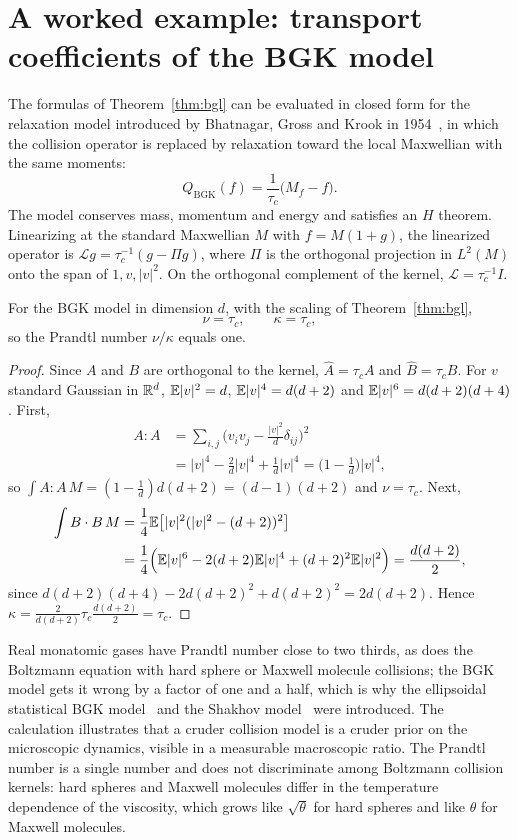 \section{A worked example: transport coefficients of the BGK model}

The formulas of Theorem~\ref{thm:bgl} can be evaluated in closed form for the relaxation model introduced by Bhatnagar, Gross and Krook in 1954~\cite{bhatnagar1954}, in which the collision operator is replaced by relaxation toward the local Maxwellian with the same moments:
\[
Q_{\mathrm{BGK}}(f) = \frac{1}{\tau_c}\big(M_f-f\big).
\]
The model conserves mass, momentum and energy and satisfies an $H$ theorem. Linearizing at the standard Maxwellian $M$ with $f = M(1+g)$, the linearized operator is $\mathcal{L}g = \tau_c^{-1}(g-\Pi g)$, where $\Pi$ is the orthogonal projection in $L^2(M)$ onto the span of $1,v,|v|^2$. On the orthogonal complement of the kernel, $\mathcal{L} = \tau_c^{-1}I$.

\begin{proposition}
For the BGK model in dimension $d$, with the scaling of Theorem~\ref{thm:bgl},
\[
\nu = \tau_c,\qquad\kappa = \tau_c,
\]
so the Prandtl number $\nu/\kappa$ equals one.
\end{proposition}

\begin{proof}
Since $A$ and $B$ are orthogonal to the kernel, $\hat A = \tau_cA$ and $\hat B = \tau_cB$. For $v$ standard Gaussian in $\mathbb{R}^d$, $\mathbb{E}|v|^2 = d$, $\mathbb{E}|v|^4 = d(d+2)$ and $\mathbb{E}|v|^6 = d(d+2)(d+4)$. First,
\[
\begin{aligned}A:A &= \sum_{i,j}\Big(v_iv_j-\frac{|v|^2}{d}\delta_{ij}\Big)^2\\ &= |v|^4-\frac2d|v|^4+\frac1d|v|^4 = \Big(1-\frac1d\Big)|v|^4,\end{aligned}
\]
so $\int A:A\,M = (1-\frac1d)d(d+2) = (d-1)(d+2)$ and $\nu = \tau_c$. Next,
\[
\begin{aligned}\int B\cdot B\,M &= \frac14\mathbb{E}\big[|v|^2(|v|^2-(d+2))^2\big]\\ &= \frac14\Big(\mathbb{E}|v|^6-2(d+2)\mathbb{E}|v|^4+(d+2)^2\mathbb{E}|v|^2\Big) = \frac{d(d+2)}{2},\end{aligned}
\]
since $d(d+2)(d+4)-2d(d+2)^2+d(d+2)^2 = 2d(d+2)$. Hence $\kappa = \frac{2}{d(d+2)}\tau_c\frac{d(d+2)}{2} = \tau_c$.
\end{proof}

Real monatomic gases have Prandtl number close to two thirds, as does the Boltzmann equation with hard sphere or Maxwell molecule collisions; the BGK model gets it wrong by a factor of one and a half, which is why the ellipsoidal statistical BGK model~\cite{holway1966} and the Shakhov model~\cite{shakhov1968} were introduced. The calculation illustrates that a cruder collision model is a cruder prior on the microscopic dynamics, visible in a measurable macroscopic ratio. The Prandtl number is a single number and does not discriminate among Boltzmann collision kernels: hard spheres and Maxwell molecules differ in the temperature dependence of the viscosity, which grows like $\sqrt\theta$ for hard spheres and like $\theta$ for Maxwell molecules.

